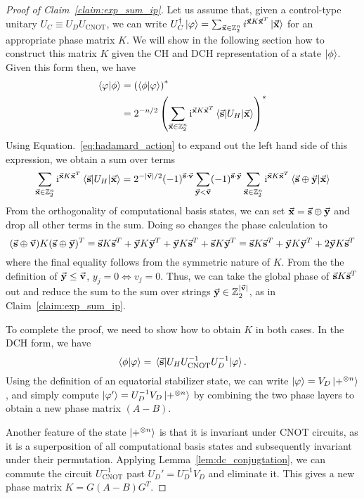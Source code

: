 \begin{proof}[Proof of Claim~\ref{claim:exp_sum_ip}]
Let us assume that, given a control-type unitary $U_{C}\equiv U_{D}U_{\text{CNOT}}$, we can write $U_{C}^{\dagger}\ket{\varphi}=\sum_{\va{x}\in\mathbb{Z}_{2}^{n}}i^{\va{x}K\va{x}^{T}}\ket{\va{x}}$ for an appropriate phase matrix $K$. We will show in the following section how to construct this matrix $K$ given the CH and DCH representation of a state $\ket{\phi}$. Given this form then, we have
\begin{align*}
\braket{\varphi}{\phi} &= \left(\braket{\phi}{\varphi}\right)^{*} \\ 
&= 2^{-n/2}\left(\sum_{\va{x}\in\mathbb{Z}_{2}^{n}}\mathi^{\va{x}K\va{x}^{T}} \matrixel{\va{s}}{U_{H}}{\va{x}} \right)^{*}\\
\end{align*}
Using Equation.~\ref{eq:hadamard_action} to expand out the left hand side of this expression, we obtain a sum over terms
\[\sum_{\va{x}\in\mathbb{Z}_{2}^{n}}\mathi^{\va{x}K\va{x}^{T}} \matrixel{\va{s}}{U_{H}}{\va{x}} = 2^{-\vert \va{v}\vert/2}(-1)^{\va{s}\cdot \va{v}}\sum_{\va{y}<\va{v}}(-1)^{\va{s}\cdot \va{y}}\sum_{\va{x}\in\mathbb{Z}_{2}^{n}}\mathi^{\va{x}K\va{x}^{T}}\braket{\va{s}\oplus \va{y}}{\va{x}}\]
From the orthogonality of computational basis states, we can set $\va{x}=\va{s}\oplus \va{y}$ and drop all other terms in the sum. Doing so changes the phase calculation to
\[(\va{s}\oplus \va{v})K(\va{s}\oplus \va{y})^{T}=\va{s}K\va{s}^{T}+\va{y}K\va{y}^{T}+\va{y}K\va{s}^{T}+\va{s}K\va{y}^{T} = \va{s}K\va{s}^{T}+\va{y}K\va{y}^{T}+2\va{y}K\va{s}^{T} \]
where the final equality follows from the symmetric nature of $K$. From the the definition of $\va{y}\leq \va{v}$, $y_{j}=0\iff v_{j}=0$. Thus, we can take the global phase of $\va{s}K\va{s}^{T}$ out and reduce the sum to the sum over strings $\va{y}\in\mathbb{Z}_{2}^{\vert \va{v}\vert}$, as in Claim~\ref{claim:exp_sum_ip}.\par
To complete the proof, we need to show how to obtain $K$ in both cases. In the DCH form, we have
\[\braket{\phi}{\varphi}=\matrixel{\va{s}}{U_{H}U_{\text{CNOT}}^{-1}U_{D}^{-1}}{\varphi}.\]
Using the definition of an equatorial stabilizer state, we can write $\ket{\varphi}=V_{D}\ket{+^{\otimes n}}$, and simply compute $\ket{\varphi'}=U_{D}^{-1}V_{D}\ket{+^{\otimes n}}$ by combining the two phase layers to obtain a new phase matrix $(A-B)$.\par
Another feature of the state $\ket{+^{\otimes n}}$ is that it is invariant under CNOT circuits, as it is a superposition of all computational basis states and subsequently invariant under their permutation. Applying Lemma~\ref{lem:dc_conjugtation}, we can commute the circuit $U_{\text{CNOT}}^{-1}$ past $U_{D}'=U_{D}^{-1}V_{D}$ and eliminate it. This gives a new phase matrix $K=G(A-B)G^{T}$.\par

\end{proof}
